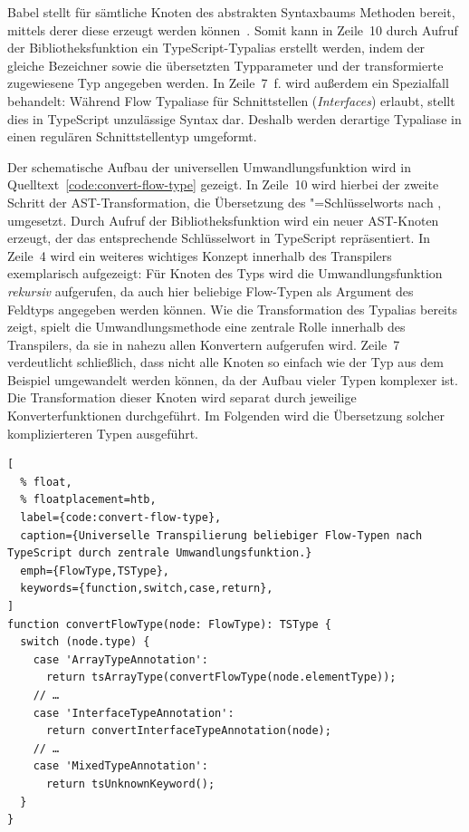 Babel stellt für sämtliche Knoten des abstrakten Syntaxbaums Methoden bereit, mittels derer diese erzeugt werden können~\autocite{BABEL:TYPES}. Somit kann in Zeile~10 durch Aufruf der Bibliotheksfunktion  ein TypeScript-Typalias erstellt werden, indem der gleiche Bezeichner sowie die übersetzten Typparameter und der transformierte zugewiesene Typ angegeben werden. In Zeile~7~f. wird außerdem ein Spezialfall behandelt: Während Flow Typaliase für Schnittstellen (\textit{Interfaces}) erlaubt, stellt dies in TypeScript unzulässige Syntax dar. Deshalb werden derartige Typaliase in einen regulären Schnittstellentyp umgeformt.

Der schematische Aufbau der universellen Umwandlungsfunktion  wird in Quelltext~\ref{code:convert-flow-type} gezeigt. In Zeile~10 wird hierbei der zweite Schritt der AST-Transformation, die Übersetzung des "=Schlüsselworts nach , umgesetzt. Durch Aufruf der Bibliotheksfunktion  wird ein neuer AST-Knoten erzeugt, der das entsprechende Schlüsselwort in TypeScript repräsentiert.
In Zeile~4 wird ein weiteres wichtiges Konzept innerhalb des Transpilers exemplarisch aufgezeigt: Für Knoten des Typs  wird die Umwandlungsfunktion \emph{rekursiv} aufgerufen, da auch hier beliebige Flow-Typen als Argument des Feldtyps angegeben werden können. Wie die Transformation des Typalias bereits zeigt, spielt die Umwandlungsmethode  eine zentrale Rolle innerhalb des Transpilers, da sie in nahezu allen Konvertern aufgerufen wird. Zeile~7 verdeutlicht schließlich, dass nicht alle Knoten so einfach wie der Typ  aus dem Beispiel umgewandelt werden können, da der Aufbau vieler Typen komplexer ist. Die Transformation dieser Knoten wird separat durch jeweilige Konverterfunktionen durchgeführt. Im Folgenden wird die Übersetzung solcher komplizierteren Typen ausgeführt.

\begin{lstlisting}[
  % float,
  % floatplacement=htb,
  label={code:convert-flow-type},
  caption={Universelle Transpilierung beliebiger Flow-Typen nach TypeScript durch zentrale Umwandlungsfunktion.}
  emph={FlowType,TSType},
  keywords={function,switch,case,return},
]
function convertFlowType(node: FlowType): TSType {
  switch (node.type) {
    case 'ArrayTypeAnnotation':
      return tsArrayType(convertFlowType(node.elementType));
    // …
    case 'InterfaceTypeAnnotation':
      return convertInterfaceTypeAnnotation(node);
    // …
    case 'MixedTypeAnnotation':
      return tsUnknownKeyword();
  }
}
\end{lstlisting}


